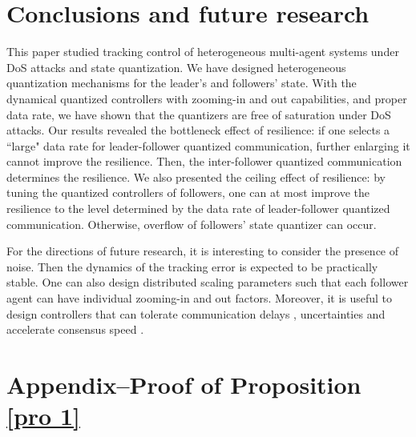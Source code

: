 \documentclass{autart}
\begin{document}
\section{Conclusions and future research}

This paper studied tracking control of heterogeneous multi-agent systems under DoS attacks and state quantization. We have designed heterogeneous quantization mechanisms for the leader's and followers' state. With the dynamical quantized controllers with zooming-in and out capabilities, and proper data rate, we have shown that the quantizers are free of saturation under DoS attacks. 
Our results revealed the bottleneck effect of resilience: if one selects a ``large" data rate for leader-follower quantized communication, further enlarging it cannot improve the resilience. Then, the inter-follower quantized communication determines the resilience.  
We also presented the ceiling effect of resilience: by tuning the quantized controllers of followers, one can at most improve the resilience to the level determined by the data rate of leader-follower quantized communication. Otherwise, overflow of followers' state quantizer can occur.


For the directions of future research, it is interesting to consider the presence of noise. Then the dynamics of the tracking error is expected to be practically stable\cite{ran2021practical}. One can also design distributed scaling parameters such that each follower agent can have individual zooming-in and out factors. Moreover, it is useful to design controllers that can tolerate communication delays \cite{10075504}, uncertainties \cite{shariati2016descriptor} and accelerate consensus speed \cite{moradian2022study}. 



\section*{Appendix--Proof of Proposition \ref{pro 1}}
\end{document}
